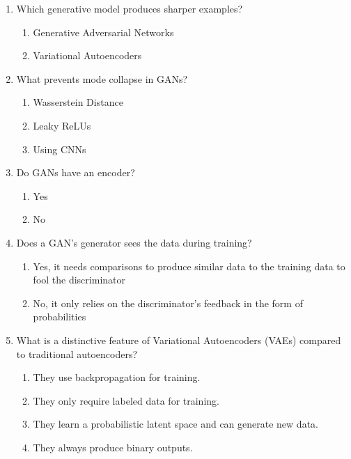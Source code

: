 \documentclass{report}
\numberwithin{equation}{section}
\begin{document}
\begin{enumerate}
    \item Which generative model produces sharper examples?
    \begin{enumerate}[label=\alph*.]
        \item Generative Adversarial Networks
        \item Variational Autoencoders
    \end{enumerate}
    \item What prevents mode collapse in GANs?
    \begin{enumerate}[label=\alph*.]
        \item Wasserstein Distance
        \item Leaky ReLUs
        \item Using CNNs
    \end{enumerate}
    \item Do GANs have an encoder?
    \begin{enumerate}[label=\alph*.]
        \item Yes
        \item No
    \end{enumerate}
    \item Does a GAN's generator sees the data during training?
    \begin{enumerate}[label=\alph*.]
        \item Yes, it needs comparisons to produce similar data to the training data to fool the discriminator
        \item No, it only relies on the discriminator's feedback in the form of probabilities
    \end{enumerate}

\item What is a distinctive feature of Variational Autoencoders (VAEs) compared to traditional autoencoders?
\begin{enumerate}[label=\alph*.]
    \item They use backpropagation for training.
    \item They only require labeled data for training.
    \item They learn a probabilistic latent space and can generate new data.
    \item They always produce binary outputs.
\end{enumerate}


\end{enumerate}
\end{document}
